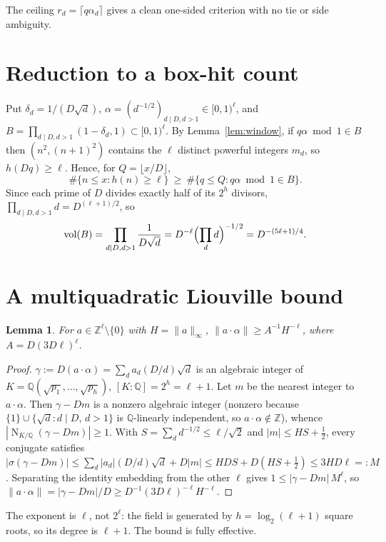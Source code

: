 \documentclass[11pt]{article}
\newtheorem{lemma}{Lemma}
\theoremstyle{definition}
\DeclareMathOperator{\Nm}{N}
\newcommand{\Z}{\mathbb{Z}}
\newcommand{\Q}{\mathbb{Q}}
\newcommand{\norm}[1]{\lVert #1 \rVert}
\begin{document}
The ceiling $r_d=\lceil q\alpha_d\rceil$ gives a clean one-sided criterion with no tie or side ambiguity.

\section{Reduction to a box-hit count}
Put $\delta_d=1/(D\sqrt d)$, $\alpha=(d^{-1/2})_{d\mid D,d>1}\in[0,1)^\ell$, and
$B=\prod_{d\mid D,d>1}(1-\delta_d,1)\subset[0,1)^\ell$. By Lemma~\ref{lem:window}, if $q\alpha\bmod1\in B$ then
$(n^2,(n+1)^2)$ contains the $\ell$ distinct powerful integers $m_d$, so $h(Dq)\ge\ell$. Hence, for
$Q=\lfloor x/D\rfloor$,
\[
  \#\{n\le x:h(n)\ge\ell\}\ \ge\ \#\{q\le Q: q\alpha\bmod1\in B\}.
\]
Since each prime of $D$ divides exactly half of its $2^h$ divisors, $\prod_{d\mid D,d>1}d=D^{(\ell+1)/2}$, so
\[
  \operatorname{vol}(B)=\prod_{d\mid D,d>1}\frac1{D\sqrt d}=D^{-\ell}\Bigl(\prod_{d}d\Bigr)^{-1/2}=D^{-(5\ell+1)/4}.
\]

\section{A multiquadratic Liouville bound}
\begin{lemma}\label{lem:liouville}
For $a\in\Z^\ell\setminus\{0\}$ with $H=\norm{a}_\infty$, $\norm{a\cdot\alpha}\ge A^{-1}H^{-\ell}$, where
$A=D(3D\ell)^\ell$.
\end{lemma}
\begin{proof}
$\gamma:=D(a\cdot\alpha)=\sum_{d}a_d(D/d)\sqrt d$ is an algebraic integer of
$K=\Q(\sqrt{p_1},\dots,\sqrt{p_h})$, $[K:\Q]=2^h=\ell+1$. Let $m$ be the nearest integer to $a\cdot\alpha$.
Then $\gamma-Dm$ is a nonzero algebraic integer (nonzero because $\{1\}\cup\{\sqrt d:d\mid D,\,d>1\}$ is
$\Q$-linearly independent, so $a\cdot\alpha\notin\Z$), whence $|\Nm_{K/\Q}(\gamma-Dm)|\ge1$. With $S=\sum_d d^{-1/2}\le
\ell/\sqrt2$ and $|m|\le HS+\tfrac12$, every conjugate satisfies
$|\sigma(\gamma-Dm)|\le\sum_d|a_d|(D/d)\sqrt d+D|m|\le HDS+D(HS+\tfrac12)\le3HD\ell=:M$. Separating the
identity embedding from the other $\ell$ gives $1\le|\gamma-Dm|\,M^\ell$, so
$\norm{a\cdot\alpha}=|\gamma-Dm|/D\ge D^{-1}(3D\ell)^{-\ell}H^{-\ell}$.
\end{proof}
The exponent is $\ell$, not $2^\ell$: the field is generated by $h=\log_2(\ell+1)$ square roots, so its degree
is $\ell+1$. The bound is fully effective.
\end{document}
